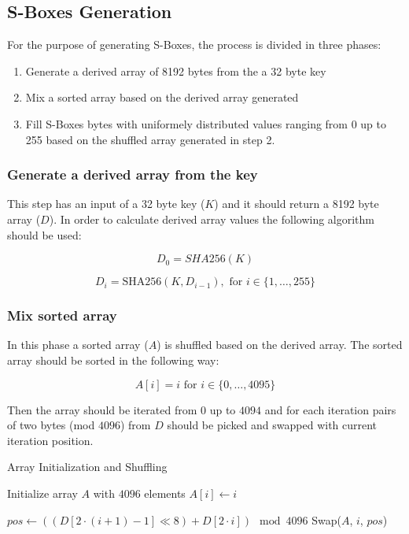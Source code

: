 \documentclass{article} %
\begin{document}
\subsection{S-Boxes Generation}
\label{sboxgen}
For the purpose of generating S-Boxes, the process is divided in three phases:
\begin{enumerate}
  \item Generate a derived array of 8192 bytes from the a 32 byte key
  \item Mix a sorted array based on the derived array generated
  \item Fill S-Boxes bytes with uniformely distributed values ranging from 0 up to 255 based on the shuffled array generated in step 2. 
\end{enumerate}

\subsubsection{Generate a derived array from the key}
This step has an input of a 32 byte key ($K$) and it should return a 8192 byte array ($D$).
In order to calculate derived array values the following algorithm should be used:

\begin{equation}
  D_0 = SHA256(K)
\end{equation}

\begin{equation}
  D_i = \text{SHA256}(K, D_{i-1}), \text{ for } i \in \{1, \ldots, 255\}
\end{equation}

\subsubsection{Mix sorted array}
In this phase a sorted array ($A$) is shuffled based on the derived array.
The sorted array should be sorted in the following way:

\begin{equation}
  A[i] = i \text{ for } i \in \{0, \ldots, 4095\}
\end{equation}

Then the array should be iterated from $0$ up to $4094$ and for each iteration pairs of two bytes (mod $4096$) from $D$ should be picked and swapped with current iteration position.

\begin{algorithm}[H]
  \caption{Array Initialization and Shuffling}
  \begin{algorithmic}[1]
  \State Initialize array $A$ with $4096$ elements
      \State $A[i] \gets i$
  \EndFor
  
      \State $pos \gets ((D[2 \cdot (i+1) - 1] \ll 8) + D[2 \cdot i]) \mod 4096$
      \State Swap($A$, $i$, $pos$)
  \EndFor
  \end{algorithmic}
\end{algorithm}
\end{document}
